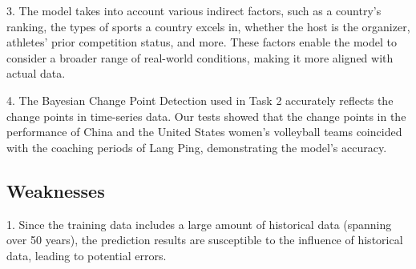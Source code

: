 \documentclass[12pt]{article}  %
\begin{document}
3. The model takes into account various indirect factors, such as a country's ranking, the types of sports a country excels in, whether the host is the organizer, athletes' prior competition status, and more. These factors enable the model to consider a broader range of real-world conditions, making it more aligned with actual data.

4. The Bayesian Change Point Detection used in Task 2 accurately reflects the change points in time-series data. Our tests showed that the change points in the performance of China and the United States women's volleyball teams coincided with the coaching periods of Lang Ping, demonstrating the model's accuracy.
\subsection{Weaknesses}
1. Since the training data includes a large amount of historical data (spanning over 50 years), the prediction results are susceptible to the influence of historical data, leading to potential errors.

 	
 	
\end{document}
